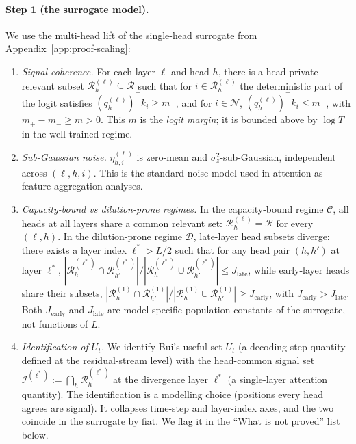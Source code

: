 \paragraph{Step 1 (the surrogate model).}
We use the multi-head lift of the single-head surrogate from
Appendix~\ref{app:proof-scaling}:
\begin{enumerate}
  \item[\textbf{(A1)}] \emph{Signal coherence.} For each layer $\ell$ and head
  $h$, there is a head-private relevant subset $\mathcal{R}^{(\ell)}_h
  \subseteq \mathcal{R}$ such that for $i \in \mathcal{R}^{(\ell)}_h$ the
  deterministic part of the logit satisfies
  $(q^{(\ell)}_h)^\top k_i \geq m_+$, and for $i \in \mathcal{N}$,
  $(q^{(\ell)}_h)^\top k_i \leq m_-$, with $m_+ - m_- \geq m > 0$.
  This $m$ is the \emph{logit margin}; it is bounded above by $\log T$ in
  the well-trained regime.
  \item[\textbf{(A2)}] \emph{Sub-Gaussian noise.}
  $\eta^{(\ell)}_{h, i}$ is zero-mean and $\sigma_z^2$-sub-Gaussian,
  independent across $(\ell, h, i)$. This is the standard noise model
  used in attention-as-feature-aggregation analyses.
  \item[\textbf{(A3)}] \emph{Capacity-bound vs dilution-prone regimes.}
  In the capacity-bound regime $\mathcal{C}$, all heads at all layers share a
  common relevant set: $\mathcal{R}^{(\ell)}_h = \mathcal{R}$ for every
  $(\ell, h)$. In the dilution-prone regime $\mathcal{D}$, late-layer head
  subsets diverge: there exists a layer index $\ell^* > L/2$ such that for
  any head pair $(h, h')$ at layer $\ell^*$,
  $|\mathcal{R}^{(\ell^*)}_h \cap \mathcal{R}^{(\ell^*)}_{h'}|
  / |\mathcal{R}^{(\ell^*)}_h \cup \mathcal{R}^{(\ell^*)}_{h'}|
  \leq J_{\text{late}}$, while early-layer heads share their subsets,
  $|\mathcal{R}^{(1)}_h \cap \mathcal{R}^{(1)}_{h'}| /
  |\mathcal{R}^{(1)}_h \cup \mathcal{R}^{(1)}_{h'}| \geq J_{\text{early}}$,
  with $J_{\text{early}} > J_{\text{late}}$. Both $J_{\text{early}}$
  and $J_{\text{late}}$ are model-specific population constants of the
  surrogate, not functions of $L$.
  \item[\textbf{(A4)}] \emph{Identification of $U_t$.} We identify Bui's
  useful set $U_t$ (a decoding-step quantity defined at the
  residual-stream level) with the head-common signal set
  $\mathcal{I}^{(\ell^*)} := \bigcap_h \mathcal{R}^{(\ell^*)}_h$ at the
  divergence layer $\ell^*$ (a single-layer attention quantity). The
  identification is a modelling choice (positions every head agrees are
  signal). It collapses time-step and layer-index axes, and the two
  coincide in the surrogate by fiat. We flag it in the ``What is not
  proved'' list below.
\end{enumerate}

